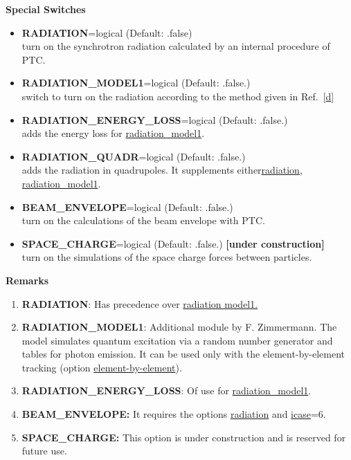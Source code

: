 {\bf Special Switches}\\
\begin{itemize}
   \item {\bf RADIATION}=logical (Default: .false)\\ 
     turn on the synchrotron radiation calculated by an internal procedure of PTC.

   \item {\bf RADIATION\_MODEL1}=logical (Default: .false.)\\
     switch to turn on the radiation according to the method given in
     Ref.~[\hyperlink{G.J._Roy}{d}] 

   \item {\bf RADIATION\_ENERGY\_LOSS}=logical (Default: .false.)\\
     adds the energy loss for \hyperlink{RADIATION_MODEL1}{radiation\_model1}.

   \item {\bf RADIATION\_QUADR}=logical (Default: .false.)\\
     adds the radiation in quadrupoles. It supplements
     either\hyperlink{RADIATION}{radiation},
     \hyperlink{RADIATION_MODEL1}{radiation\_model1}.

   \item {\bf BEAM\_ENVELOPE}=logical (Default: .false.)\\
     turn on the calculations of the beam envelope with PTC.

   \item {\bf SPACE\_CHARGE}=logical (Default: .false.)  {\bf [under
       construction]}\\
     turn on the simulations of the space charge forces between particles. 
\end{itemize}

{\bf Remarks}\\
\begin{enumerate}
   \item{\bf RADIATION}: Has precedence over 
     \hyperlink{RADIATION_MODEL1}{radiation model1.} 

   \item{\bf RADIATION\_MODEL1}: Additional 
     module by F. Zimmermann. The model simulates 
     quantum excitation via a random number generator and tables for 
     photon emission. It can be used only with the element-by-element 
     tracking (option \hyperlink{ELEMENT_BY_ELEMENT}{element-by-element}).
     
   \item {\bf RADIATION\_ENERGY\_LOSS}: Of use for
     \hyperlink{RADIATION_MODEL1}{radiation\_model1}.

   \item {\bf BEAM\_ENVELOPE:} It requires the options
     \hyperlink{RADIATION}{radiation} and \hyperlink{ICASE}{icase}=6.
     
   \item {\bf SPACE\_CHARGE:} This option 
     is under construction and is reserved for future use.
\end{enumerate}



